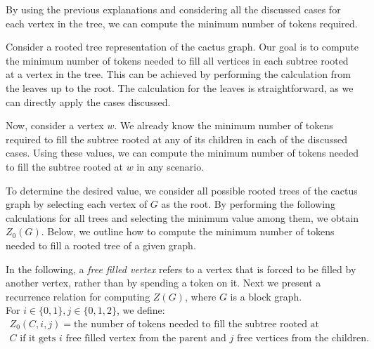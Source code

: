 \documentclass[11pt]{article}
\theoremstyle{plain}
\theoremstyle{definition}
\theoremstyle{remark}
\begin{document}
By using the previous explanations and considering all the discussed cases for each vertex in the tree, we can compute the minimum number of tokens required.

Consider a rooted tree representation of the cactus graph. Our goal is to compute the minimum number of tokens needed to fill all vertices in each subtree rooted at a vertex in the tree. This can be achieved by performing the calculation from the leaves up to the root. The calculation for the leaves is straightforward, as we can directly apply the cases discussed.

Now, consider a vertex $w$. We already know the minimum number of tokens required to fill the subtree rooted at any of its children in each of the discussed cases. Using these values, we can compute the minimum number of tokens needed to fill the subtree rooted at $w$ in any scenario.

To determine the desired value, we consider all possible rooted trees of the cactus graph by selecting each vertex of $G$ as the root. By performing the following calculations for all trees and selecting the minimum value among them, we obtain $Z_0(G)$. Below, we outline how to compute the minimum number of tokens needed to fill a rooted tree of a given graph.

In the following, a \textit{free filled vertex} refers to a vertex that is forced to be filled by another vertex, rather than by spending a token on it. Next we present a recurrence relation for computing $Z(G)$, where $G$ is a block graph.\\


For $ i \in \{0,1\}, j \in \{0,1,2\} $, we define:
\begin{multline*}
   Z_0(C, i, j) = \text{the number of tokens needed to fill the subtree rooted at } \\ C \text{ if it gets } i \text{ free filled vertex from the parent and } j \text{ free vertices from the children.} 
\end{multline*}

\allowdisplaybreaks
\end{document}
